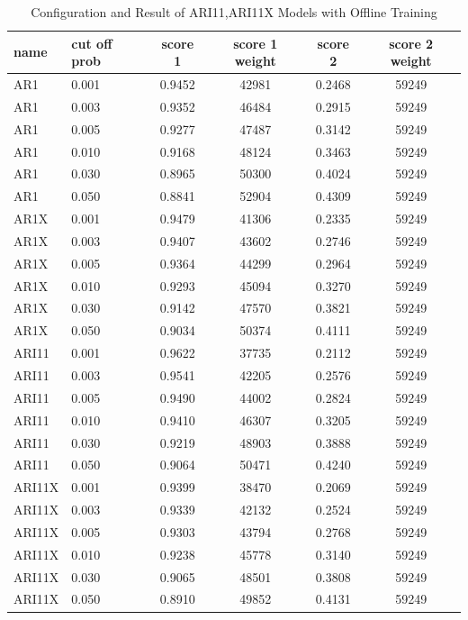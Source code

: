 \documentclass{article}
\begin{document}
\begin{longtable}[htbp]{l|l|*{4}{c}}
    \caption{Configuration and Result of ARI11,ARI11X Models with Offline Training}
    \label{tab:tab1.3.1} \\
    \textbf{name} & \textbf{cut off prob} & \textbf{score 1} & \textbf{score 1
    weight} & \textbf{score 2} & \textbf{score 2 weight}\\
    \hline
    AR1 & 0.001 & 0.9452 & 42981 & 0.2468 & 59249\\
    AR1 & 0.003 & 0.9352 & 46484 & 0.2915 & 59249\\
    AR1 & 0.005 & 0.9277 & 47487 & 0.3142 & 59249\\
    AR1 & 0.010 & 0.9168 & 48124 & 0.3463 & 59249\\
    AR1 & 0.030 & 0.8965 & 50300 & 0.4024 & 59249\\
    AR1 & 0.050 & 0.8841 & 52904 & 0.4309 & 59249\\
    AR1X & 0.001 & 0.9479 & 41306 & 0.2335 & 59249\\
    AR1X & 0.003 & 0.9407 & 43602 & 0.2746 & 59249\\
    AR1X & 0.005 & 0.9364 & 44299 & 0.2964 & 59249\\
    AR1X & 0.010 & 0.9293 & 45094 & 0.3270 & 59249\\
    AR1X & 0.030 & 0.9142 & 47570 & 0.3821 & 59249\\
    AR1X & 0.050 & 0.9034 & 50374 & 0.4111 & 59249\\
    ARI11 & 0.001 & 0.9622 & 37735 & 0.2112 & 59249\\
    ARI11 & 0.003 & 0.9541 & 42205 & 0.2576 & 59249\\
    ARI11 & 0.005 & 0.9490 & 44002 & 0.2824 & 59249\\
    ARI11 & 0.010 & 0.9410 & 46307 & 0.3205 & 59249\\
    ARI11 & 0.030 & 0.9219 & 48903 & 0.3888 & 59249\\
    ARI11 & 0.050 & 0.9064 & 50471 & 0.4240 & 59249\\
    ARI11X & 0.001 & 0.9399 & 38470 & 0.2069 & 59249\\
    ARI11X & 0.003 & 0.9339 & 42132 & 0.2524 & 59249\\
    ARI11X & 0.005 & 0.9303 & 43794 & 0.2768 & 59249\\
    ARI11X & 0.010 & 0.9238 & 45778 & 0.3140 & 59249\\
    ARI11X & 0.030 & 0.9065 & 48501 & 0.3808 & 59249\\
    ARI11X & 0.050 & 0.8910 & 49852 & 0.4131 & 59249\\

\end{longtable}
\end{document}
